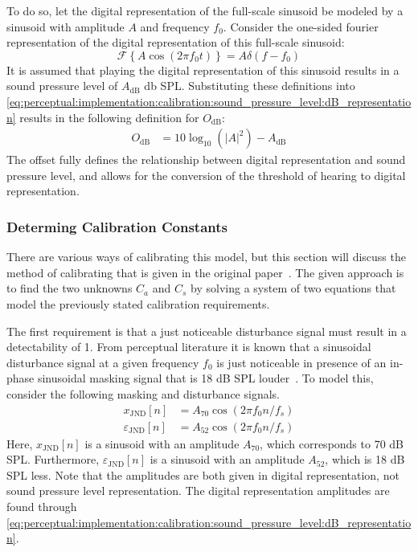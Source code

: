 To do so, let the digital representation of the full-scale sinusoid be modeled by a sinusoid with amplitude $A$ and frequency $f_0$.
Consider the one-sided fourier representation of the digital representation of this full-scale sinusoid: 
\begin{equation}
    \mathcal{F}\left\{A\cos\left(2\pi f_0 t\right)\right\} = A\delta\left(f - f_0\right)
\end{equation}
It is assumed that playing the digital representation of this sinusoid results in a sound pressure level of $A_\text{dB}$ db SPL. 
Substituting these definitions into \autoref{eq:perceptual:implementation:calibration:sound_pressure_level:dB_representation} 
results in the following definition for $O_\text{dB}$: 
\begin{align}
    O_\text{dB} &= 10\log_{10}\left(\left|A\right|^2\right) - A_\text{dB} 
\end{align}
The offset fully defines the relationship between digital representation and sound pressure level, and allows for the conversion of the threshold of hearing
to digital representation.

\subsubsection{Determing Calibration Constants}
\label{ch:perceptual:implementation:calibration:coefficients}
There are various ways of calibrating this model, but this section will discuss the method of calibrating 
that is given in the original paper~\cite{van2005perceptual}.
The given approach is to find the two unknowns $C_a$ and $C_s$ by solving a system of two equations that model the previously stated calibration requirements.

The first requirement is that a just noticeable disturbance signal must result in a detectability of 1.
From perceptual literature it is known that a sinusoidal disturbance signal at a given frequency $f_0$ is just noticeable 
in presence of an in-phase sinusoidal masking signal that is 18 dB SPL louder~\cite{van2005perceptual}.
To model this, consider the following masking and disturbance signals. 
\begin{align}
    x_\text{JND}[n] &= A_{70}\cos\left(2\pi f_0 n / f_s\right) \\
    \varepsilon_\text{JND}[n] &= A_{52}\cos\left(2\pi f_0 n / f_s\right)
\end{align}
Here, $x_\text{JND}[n]$ is a sinusoid with an amplitude $A_{70}$, which corresponds to 70 dB SPL.
Furthermore, $\varepsilon_\text{JND}[n]$ is a sinusoid with an amplitude $A_{52}$, which is 18 dB SPL less.
Note that the amplitudes are both given in digital representation, not sound pressure level representation.
The digital representation amplitudes are found through \autoref{eq:perceptual:implementation:calibration:sound_pressure_level:dB_representation}.

